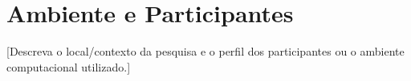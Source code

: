 %
%
%
%
%
%
%



\section{Ambiente e Participantes}


[Descreva o local/contexto da pesquisa e o perfil dos participantes
ou o ambiente computacional utilizado.]



